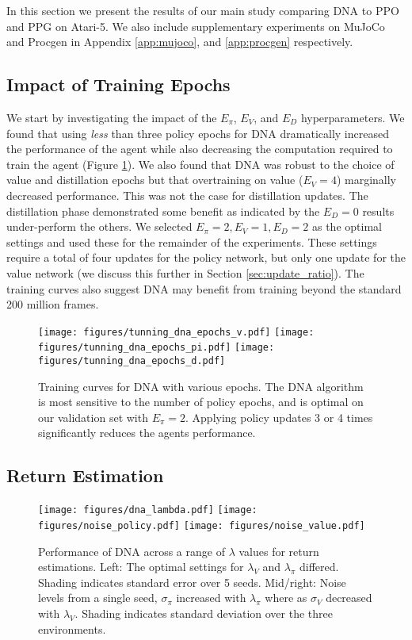 \documentclass{article}
\begin{document}
In this section we present the results of our main study comparing DNA to PPO and PPG on Atari-5. We also include supplementary experiments on MuJoCo \cite{todorov2012mujoco} and Procgen \cite{cobbe2020leveraging} in Appendix \ref{app:mujoco}, and \ref{app:procgen} respectively. 

\subsection{Impact of Training Epochs}

We start by investigating the impact of the $E_\pi$, $E_V$, and $E_D$ hyperparameters. We found that using \textit{less} than three policy epochs for DNA dramatically increased the performance of the agent while also decreasing the computation required to train the agent (Figure \ref{fig:dna_tuning}). We also found that DNA was robust to the choice of value and distillation epochs but that overtraining on value ($E_V=4$) marginally decreased performance. This was not the case for distillation updates. The distillation phase demonstrated some benefit as indicated by the $E_D=0$ results under-perform the others. We selected $E_\pi=2, E_V=1, E_D=2$ as the optimal settings and used these for the remainder of the experiments. These settings require a total of four updates for the policy network, but only one update for the value network (we discuss this further in Section \ref{sec:update_ratio}). The training curves also suggest DNA may benefit from training beyond the standard 200 million frames. 

\begin{figure}[t]
    \centering
    \texttt{[image: figures/tunning\_dna\_epochs\_v.pdf]}
    \texttt{[image: figures/tunning\_dna\_epochs\_pi.pdf]}
    \texttt{[image: figures/tunning\_dna\_epochs\_d.pdf]}
    \caption{Training curves for DNA with various epochs. The DNA algorithm is most sensitive to the number of policy epochs, and is optimal on our validation set with $E_\pi=2$. Applying policy updates 3 or 4 times significantly reduces the agents performance.}
    \label{fig:dna_tuning}
\end{figure}

\subsection{Return Estimation}
\label{sec:results_re}

\begin{figure}[!t]
    \centering
    \texttt{[image: figures/dna\_lambda.pdf]}
    \texttt{[image: figures/noise\_policy.pdf]}
    \texttt{[image: figures/noise\_value.pdf]}
    \caption{Performance of DNA across a range of $\lambda$ values for return estimations. Left: The optimal settings for $\lambda_V$ and $\lambda_\pi$ differed. Shading indicates standard error over 5 seeds. Mid/right: Noise levels from a single seed, $\sigma_\pi$ increased with $\lambda_\pi$ where as $\sigma_V$ decreased with $\lambda_V$. Shading indicates standard deviation over the three environments.}
    \label{fig:dna_lambda}
\end{figure}
\end{document}
